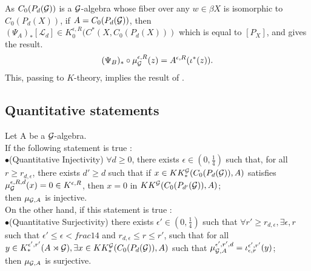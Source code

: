 \begin{itemize}
As $C_0(P_d(\mathcal G))$ is a $\mathcal G$-algebra whose fiber over any $w\in\beta X$ is isomorphic to $C_0(P_d(X))$, if $A=C_0(P_d(\mathcal G))$, then $(\Psi_A)_*[\mathcal L_d]\in K^{\epsilon , R}_0(C^*(X,C_0(P_d(X)))$ which is equal to $[P_X]$, and gives the result.
\[(\Psi_B)_*\circ\mu^{\epsilon,R}_\mathcal G (z) = A^{\epsilon,R}(\iota^*(z)).\]
This, passing to $K$-theory, implies the result of \cite{SkTuYu}.\\
\end{itemize}

\subsection{Quantitative statements}

\begin{prop} 
Let A be a $\mathcal G$-algebra.\\
If the following statement is true :\\

$\bullet$(Quantitative Injectivity) $\forall d\geq 0$, there exists $\epsilon\in (0,\frac{1}{4})$ such that, for all $r\geq r_{d,\epsilon}$, there exists $d'\geq d$ such that if $x\in KK_*^\mathcal G(C_0(P_d(\mathcal G)),A)$ satisfies $\mu_\mathcal G^{\epsilon,R,d}(x)=0\in K^{\epsilon,R}$, then $x=0$ in $KK^\mathcal G(C_0(P_{d'}(\mathcal G)),A)$;\\

then $\mu_{\mathcal G,A}$ is injective.\\

On the other hand, if this statement is true : \\

$\bullet$(Quantitative Surjectivity) there exists $\epsilon'\in (0,\frac{1}{4})$ such that $\forall r'\geq r_{d,\epsilon},\exists \epsilon,r$ such that $\epsilon'\leq \epsilon<frac{1}{4}$ and $r_{d,\epsilon}\leq r\leq r'$, such that for all $y\in K_*^{\epsilon',r'}(A\rtimes\mathcal G),\exists x \in KK_*^\mathcal G(C_0(P_d(\mathcal G)),A)$ such that $\mu_{\mathcal G,A}^{\epsilon',r',d}=\iota_{\epsilon,r}^{\epsilon',r'}(y)$;\\

then $\mu_{\mathcal G,A}$ is surjective.
\end{prop}

